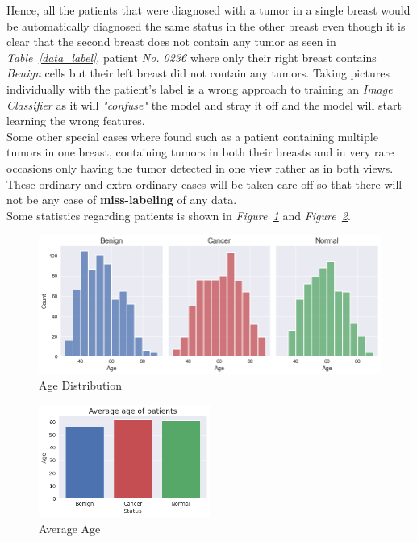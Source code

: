 \documentclass[12pt]{extarticle}
\begin{document}
	Hence, all the patients that were diagnosed with a tumor in a single breast would be automatically diagnosed the same status in the other breast even though it is clear that the second breast does not contain any tumor as seen in \emph{Table~\ref{data_label}}, patient \emph{No. 0236} where only their right breast contains \emph{Benign} cells but their left breast did not contain any tumors. Taking pictures individually with the patient's label is a wrong approach to training an \emph{Image Classifier} as it will \emph{"confuse"} the model and stray it off and the model will start learning the wrong features.\\[5mm]
	Some other special cases where found such as a patient containing multiple tumors in one breast, containing tumors in both their breasts and in very rare occasions only having the tumor detected in one view rather as in both views.\\[5mm]
	These ordinary and extra ordinary cases will be taken care off so that there will not be any case of \textbf{miss-labeling} of any data.\\[5mm]
	Some statistics regarding patients is shown in \emph{Figure~\ref{fig:Age_Dist}} and \emph{Figure~\ref{fig:Avg_Age}}.
	
	\begin{figure}[h]
		\centering
		\includegraphics[width=1\textwidth]{pics/Figures/Age_Dist.png}
		\caption{\small{Age Distribution}}
		\label{fig:Age_Dist}
	\end{figure}
	\begin{figure}[h]
		\centering
		\includegraphics[width=0.5\textwidth]{pics/Figures/Avg_Age.png}
		\caption{\small{Average Age}}
		\label{fig:Avg_Age}
	\end{figure}
	
\end{document}
